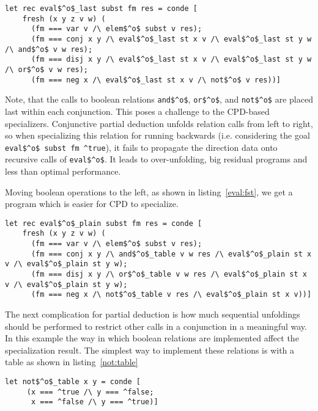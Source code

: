 \begin{lstlisting}[label={eval:last}, caption={Evaluator of formulas with boolean operation last}, captionpos=b]
  let rec eval$^o$_last subst fm res = conde [
    fresh (x y z v w) (
      (fm === var v /\ elem$^o$ subst v res);
      (fm === conj x y /\ eval$^o$_last st x v /\ eval$^o$_last st y w /\ and$^o$ v w res);
      (fm === disj x y /\ eval$^o$_last st x v /\ eval$^o$_last st y w /\ or$^o$ v w res);
      (fm === neg x /\ eval$^o$_last st x v /\ not$^o$ v res))]
\end{lstlisting}

Note, that the calls to boolean relations \lstinline{and$^o$}, \lstinline{or$^o$}, and \lstinline{not$^o$} are placed last within each conjunction.
This poses a challenge to the CPD-based specializers.
Conjunctive partial deduction unfolds relation calls from left to right, so when specializing this relation for running backwards (i.e. considering the goal \lstinline{eval$^o$ subst fm ^true}), it fails to propagate the direction data onto recursive calls of \lstinline{eval$^o$}.
It leads to over-unfolding, big residual programs and less than optimal performance.

Moving boolean operations to the left, as shown in listing~\ref{eval:fst}, we get a program which is easier for CPD to specialize.


\begin{lstlisting}[label={eval:fst}, caption={Evaluator of formulas with boolean operation second}, captionpos=b]
  let rec eval$^o$_plain subst fm res = conde [
    fresh (x y z v w) (
      (fm === var v /\ elem$^o$ subst v res);
      (fm === conj x y /\ and$^o$_table v w res /\ eval$^o$_plain st x v /\ eval$^o$_plain st y w);
      (fm === disj x y /\ or$^o$_table v w res /\ eval$^o$_plain st x v /\ eval$^o$_plain st y w);
      (fm === neg x /\ not$^o$_table v res /\ eval$^o$_plain st x v))]
  \end{lstlisting}

The next complication for partial deduction is how much sequential unfoldings should be performed to  restrict other calls in a conjunction in a meaningful way.
In this example the way in which boolean relations are implemented affect the specialization result.
The simplest way to implement these relations is with a table as shown in listing~\ref{not:table}

\begin{lstlisting}[label={not:table}, caption={Implementation of boolean \lstinline{not} as a table}, captionpos=b]
  let not$^o$_table x y = conde [
     (x === ^true /\ y === ^false;
      x === ^false /\ y === ^true)]
\end{lstlisting}

